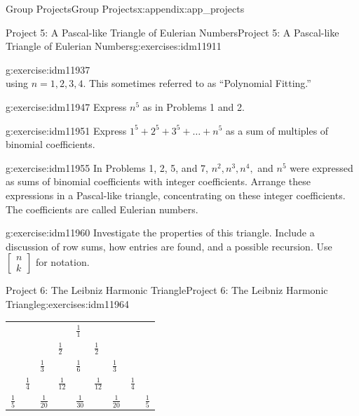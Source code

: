 \documentclass[oneside,10pt,]{book}
\numberwithin{equation}{chapter}
\begin{document}
\begin{appendixptx}{Group Projects}{}{Group Projects}{}{}{x:appendix:app_projects}
\begin{exercises-section-numberless}{Project 5: A Pascal-like Triangle of Eulerian Numbers}{}{Project 5: A Pascal-like Triangle of Eulerian Numbers}{}{}{g:exercises:idm11911}
\begin{divisionexercise}{7}{}{}{g:exercise:idm11937}
\begin{equation*}
\end{equation*}
using \(n=1, 2, 3, 4\). This sometimes referred to as ``Polynomial Fitting.''%
\end{divisionexercise}%
\begin{divisionexercise}{8}{}{}{g:exercise:idm11947}%
Express \(n^{5}\) as in Problems 1 and 2.%
\end{divisionexercise}%
\begin{divisionexercise}{9}{}{}{g:exercise:idm11951}%
Express \(1^{5} + 2^{5} + 3^{5} + \ldots + n^{5}\) as a sum of multiples of binomial coefficients.%
\end{divisionexercise}%
\begin{divisionexercise}{10}{}{}{g:exercise:idm11955}%
In Problems 1, 2, 5, and 7, \(n^{2},n^{3},n^{4},\) and \(n^{5}\) were expressed as sums of binomial coefficients with integer coefficients. Arrange these expressions in a Pascal-like triangle, concentrating on these integer coefficients. The coefficients are called Eulerian numbers.%
\end{divisionexercise}%
\begin{divisionexercise}{11}{}{}{g:exercise:idm11960}%
Investigate the properties of this triangle. Include a discussion of row sums, how entries are found, and a possible recursion. Use \(\begin{bmatrix}
n\\
k
\end{bmatrix}\) for notation.%
\end{divisionexercise}%
\end{exercises-section-numberless}
%
%
\typeout{************************************************}
\typeout{************************************************}
%
\begin{exercises-section-numberless}{Project 6: The Leibniz Harmonic Triangle}{}{Project 6: The Leibniz Harmonic Triangle}{}{}{g:exercises:idm11964}
\begin{sidebyside}{1}{0}{0}{0}%
\begin{sbspanel}{1}%
{\centering%
\begin{tabular}{lllllllll}
&&&&\(\frac{1}{1}\)&&&&\tabularnewline[0pt]
&&&\(\frac{1}{2}\)&&\(\frac{1}{2}\)&&&\tabularnewline[0pt]
&&\(\frac{1}{3}\)&&\(\frac{1}{6}\)&&\(\frac{1}{3}\)&&\tabularnewline[0pt]
&\(\frac{1}{4}\)&&\(\frac{1}{12}\)&&\(\frac{1}{12}\)&&\(\frac{1}{4}\)&\tabularnewline[0pt]
\(\frac{1}{5}\)&&\(\frac{1}{20}\)&&\(\frac{1}{30}\)&&\(\frac{1}{20}\)&&\(\frac{1}{5}\)
\end{tabular}
}
\end{sbspanel}
\end{sidebyside}
\end{exercises-section-numberless}
\end{appendixptx}
\end{document}
